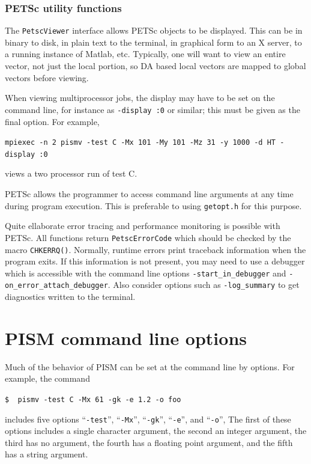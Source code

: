 \documentclass[11pt,final]{amsart}
\renewcommand{\t}[1]{\texttt{#1}}
\begin{document}
\subsubsection{PETSc utility functions}
The \t{PetscViewer} interface allows PETSc objects to be displayed. This can be in binary
to disk, in plain text to the terminal, in graphical form to an X server, to a running
instance of Matlab, etc. Typically, one will want to view an entire vector, not just the
local portion, so DA based local vectors are mapped to global vectors before viewing.

When viewing multiprocessor jobs, the display may have to be set on the command line, for instance as
\t{-display :0} or similar; this must be given as the final option.  For example,

\verb|mpiexec -n 2 pismv -test C -Mx 101 -My 101 -Mz 31 -y 1000 -d HT -display :0|

\noindent views a two processor run of test C.

PETSc allows the programmer to access command line arguments at any time during program
execution. This is preferable to using \t{getopt.h} for this purpose.

Quite ellaborate error tracing and performance monitoring is possible with PETSc.  All
functions return \t{PetscErrorCode} which should be checked by the macro \t{CHKERRQ()}.
Normally, runtime errors print traceback information when the program exits.  If this
information is not present, you may need to use a debugger which is accessible with the
command line options \verb|-start_in_debugger| and \verb|-on_error_attach_debugger|.  Also
consider options such as \verb|-log_summary| to get diagnostics written to the terminal.


\clearpage\newpage



\appendix

\clearpage\newpage
\section{PISM command line options}\label{sect:options}

Much of the behavior of PISM can be set at the command line by options.  For example, the command 

\verb|$  pismv -test C -Mx 61 -gk -e 1.2 -o foo|

\noindent includes five options ``\verb|-test|'', ``\verb|-Mx|'', ``\verb|-gk|'', ``\verb|-e|'', and ``\verb|-o|'',  The first of these options includes a single character argument, the second an integer argument, the third has no argument, the fourth has a floating point argument, and the fifth has a string argument.
\end{document}
